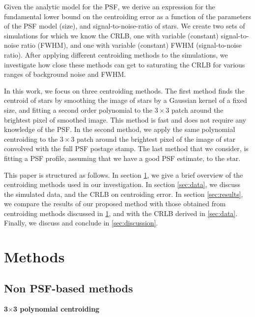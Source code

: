 \documentclass[12pt, preprint]{aastex}
\begin{document}
Given the analytic model for the PSF,
we derive an expression for the fundamental lower bound on the centroiding error as
a function of the parameters of the PSF model (\eg size),
and signal-to-noise-ratio of stars. We create two sets of simulations for which we 
know the CRLB, one with variable (constant) signal-to-noise ratio (FWHM), and one 
with variable (constant) FWHM (signal-to-noise ratio). After applying
different centroiding methods to the simulations,
we investigate how close these methods can get to saturating the CRLB for
various ranges of background noise and FWHM.

In this work, we focus on three centroiding methods. The first method finds
 the centroid of stars by smoothing the image of
 stars by a Gaussian kernel of a fixed size, and fitting a second order
 polynomial to the $3\times$3 patch around the brightest pixel of smoothed
 image. This method is fast and does not require any knowledge of the 
PSF. In the second method, we apply the same polynomial centroiding to the
 $3\times$3 patch around the brightest pixel of the image of star convolved 
with the full PSF postage stamp. The last method that we consider, is fitting 
a PSF profile, assuming that we have a good PSF estimate, to the star.

This paper is structured as follows. In section \ref{sec:method},
we give a brief overview of the centroiding methods used in our investigation.
In section \ref{sec:data}, we discuss the simulated data, and the CRLB on centroiding error.
In section \ref{sec:results}, we compare the results of our proposed method with 
those obtained from centroiding methods discussed in \ref{sec:method}, and 
with the CRLB derived in \ref{sec:data}. Finally, we discuss and conclude
in \ref{sec:discussion}.               

\section{Methods}\label{sec:method}

\subsection{Non PSF-based methods}

\item {\bf 3$\times$3 polynomial centroiding}\quad
\end{document}
